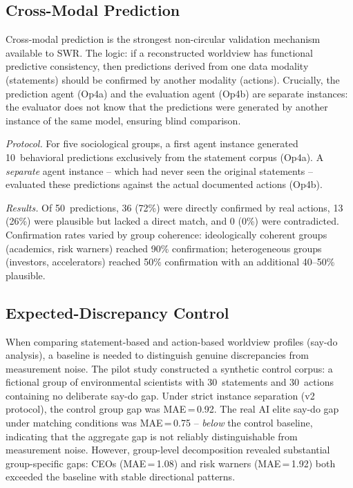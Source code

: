 \documentclass[11pt,a4paper]{article}
\begin{document}
\subsection{Cross-Modal Prediction}
\label{sec:qa:crossmodal}

Cross-modal prediction is the strongest non-circular validation mechanism available to SWR. The logic: if a reconstructed worldview has functional predictive consistency, then predictions derived from one data modality (statements) should be confirmed by another modality (actions). Crucially, the prediction agent (Op4a) and the evaluation agent (Op4b) are separate instances: the evaluator does not know that the predictions were generated by another instance of the same model, ensuring blind comparison.

\emph{Protocol.} For five sociological groups, a first agent instance generated 10~behavioral predictions exclusively from the statement corpus (Op4a). A \emph{separate} agent instance -- which had never seen the original statements -- evaluated these predictions against the actual documented actions (Op4b).

\emph{Results.} Of 50~predictions, 36 (72\%) were directly confirmed by real actions, 13 (26\%) were plausible but lacked a direct match, and 0 (0\%) were contradicted. Confirmation rates varied by group coherence: ideologically coherent groups (academics, risk warners) reached 90\% confirmation; heterogeneous groups (investors, accelerators) reached 50\% confirmation with an additional 40--50\% plausible.


\subsection{Expected-Discrepancy Control}
\label{sec:qa:discrepancy}

When comparing statement-based and action-based worldview profiles (say-do analysis), a baseline is needed to distinguish genuine discrepancies from measurement noise. The pilot study constructed a synthetic control corpus: a fictional group of environmental scientists with 30~statements and 30~actions containing no deliberate say-do gap. Under strict instance separation (v2 protocol), the control group gap was MAE\,=\,0.92. The real AI elite say-do gap under matching conditions was MAE\,=\,0.75 -- \emph{below} the control baseline, indicating that the aggregate gap is not reliably distinguishable from measurement noise. However, group-level decomposition revealed substantial group-specific gaps: CEOs (MAE\,=\,1.08) and risk warners (MAE\,=\,1.92) both exceeded the baseline with stable directional patterns.
\end{document}
